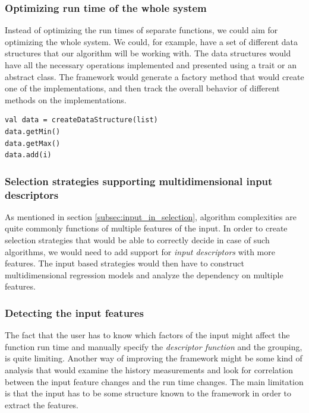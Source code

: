 \subsubsection{Optimizing run time of the whole system}

Instead of optimizing the run times of separate functions, we could aim for optimizing the whole system. We could, for example, have a set of different data structures that our algorithm will be working with. The data structures would have all the necessary operations implemented and presented using a trait or an abstract class. The framework would generate a factory method that would create one of the implementations, and then track the overall behavior of different methods on the implementations. 

\lstset{style=Scala}
\begin{lstlisting}
val data = createDataStructure(list)
data.getMin()
data.getMax()
data.add(i)
\end{lstlisting}

\subsubsection{Selection strategies supporting multidimensional input descriptors}

As mentioned in section \ref{subsec:input_in_selection}, algorithm complexities are quite commonly functions of multiple features of the input. In order to create selection strategies that would be able to correctly decide in case of such algorithms, we would need to add support for \textit{input descriptors} with more features. The input based strategies would then have to construct multidimensional regression models and analyze the dependency on multiple features.

\subsubsection{Detecting the input features}

The fact that the user has to know which factors of the input might affect the function run time and manually specify the \textit{descriptor function} and the grouping, is quite limiting. Another way of improving the framework might be some kind of analysis that would examine the history measurements and look for correlation between the input feature changes and the run time changes. The main limitation is that the input has to be some structure known to the framework in order to extract the features.

